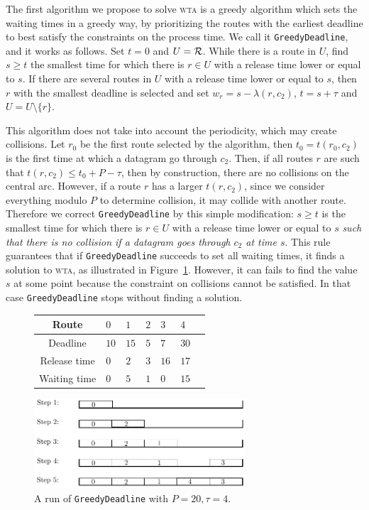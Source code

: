 \documentclass[a4paper,10pt]{article}
\newcommand\greedydeadline{\texttt{GreedyDeadline}\xspace}
\newcommand\wta{\textsc{wta}\xspace}
\begin{document}
    The first algorithm we propose to solve \wta is a greedy algorithm which sets the waiting times in a greedy way, by prioritizing the routes with the earliest deadline to best satisfy the constraints on the process time. We call it \greedydeadline, and it works as follows. Set $t=0$ and $U = \cal{R}$. While there is a route in $U$, find $s \geq t$ the smallest time for which there is $r \in U$ with a release time lower or equal to $s$. If there are several routes in $U$ with a release time lower or equal  to $s$, then $r$ with the smallest deadline is selected and set $w_r = s - \lambda(r,c_2)$, $t = s + \tau$ and $ U = U \setminus \{r\}$.

    This algorithm does not take into account the periodicity, which may create collisions. Let $r_0$ be the first route selected by the algorithm, then $t_0 = t(r_0,c_2)$ is the first time at which a datagram go through $c_2$.
	Then, if all routes $r$ are such that $t(r, c_2) \leq t_0 + P - \tau$, 
	then by construction, there are no collisions on the central arc.
      However, if a route $r$ has a larger $t(r, c_2)$, since we consider everything modulo $P$ to determine collision, it may collide with another route. Therefore we correct \greedydeadline by this simple modification: $s \geq t$ is the smallest time for which there is $r \in U$ with a release time lower or equal to $s$ \emph{such that there is no collision if a datagram goes through $c_2$ at time $s$}. This rule guarantees that if \greedydeadline succeeds to set all waiting times, it finds a solution to \wta, as illustrated in Figure~\ref{fig:greedydeadline}. However, it can fails to find the value $s$ at some point because the constraint on collisions cannot be satisfied. In that case \greedydeadline stops without finding a solution.
    
    \begin{figure}
          \begin{center}
   \begin{tabularx}{0.7\textwidth}{|c|X|X|X|X|X|X|}
    \hline
     Route& $0$ & $1$ & $2$& $3$ & $4$\\
    \hline
    Deadline & $10$ &$15$&$5$&$7$&$30$\\
    \hline
     Release time & $0$ &$2$&$3$&$16$&$17$\\
    \hline
    Waiting time & $0$ &$5$&$1$&$0$&$15$\\
    \hline
      \end{tabularx}
      
      
      \includegraphics[width=0.7\textwidth]{examplegreedy.pdf}
      \caption{A run of \greedydeadline with $P = 20, \tau = 4$.}
           \label{fig:greedydeadline}
      \end{center}
      
    \end{figure}
\end{document}
